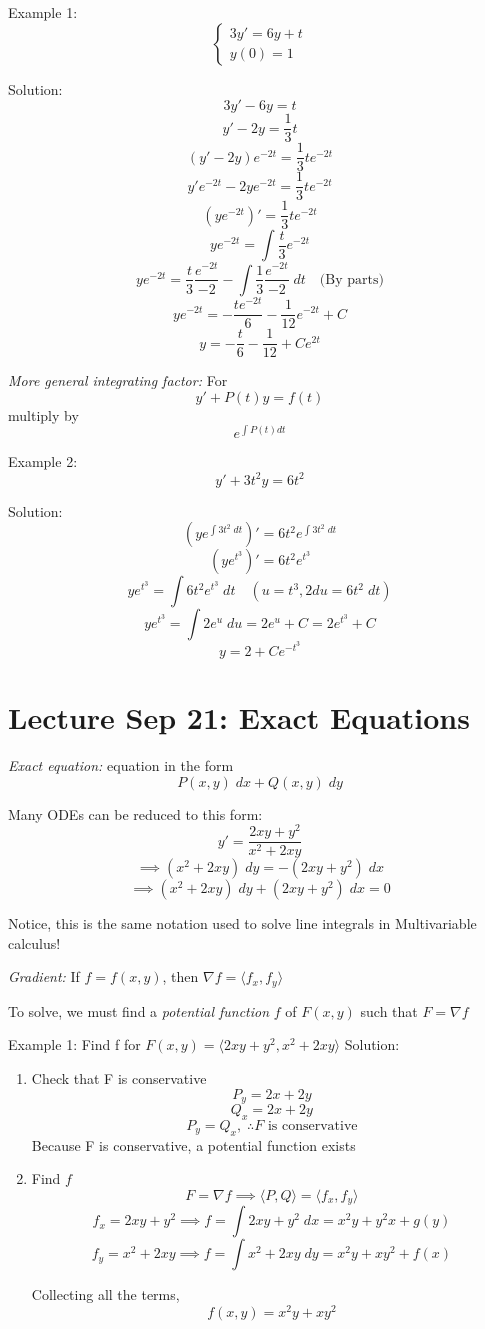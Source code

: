 \documentclass[12pt]{article}
\begin{document}
Example 1: 
\[\begin{cases}
    3y' = 6y + t\\
    y(0) = 1
\end{cases}\]

Solution:
\[3y' - 6y = t\]
\[y' - 2y = \frac{1}{3}t\]
\[(y' - 2y)e^{-2t} = \frac{1}{3}te^{-2t}\]
\[y'e^{-2t} - 2y e^{-2t} = \frac{1}{3}te^{-2t} \]
\[(y e^{-2t})' = \frac{1}{3}te^{-2t}\]
\[y e^{-2t} = \int \frac{t}{3}e^{-2t}\]
\[y e^{-2t} = \frac{t}{3} \frac{e^{-2t}}{-2} - \int \frac{1}{3} \frac{e^{-2t}}{-2}\; dt \quad \text{(By parts)}\]
\[y e^{-2t} = -\frac{te^{-2t}}{6} - \frac{1}{12}e^{-2t}+C\]
\[\boxed{y = -\frac{t}{6} - \frac{1}{12} + Ce^{2t}}\]

\emph{More general integrating factor:}
For \[y' + P(t) y = f(t)\]
multiply by 
\[e^{\int P(t) dt}\]

Example 2: 
\[y' + 3t^2 y = 6t^2\]

Solution:
\[(y e^{\int 3t^2\; dt})'= 6t^2 e^{\int 3t^2\; dt}\]
\[(y e^{t^3})' = 6t^2 e^{t^3}\]
\[ye^{t^3} = \int 6t^2 e^{t^3} \; dt \quad (u = t^3, 2du = 6t^2\; dt)\]
\[ye^{t^3} = \int 2e^u \; du = 2e^u + C = 2e^{t^3} + C\]
\[y = 2 + Ce^{-t^3}\]

\section{Lecture Sep 21: Exact Equations}
\emph{Exact equation:} equation in the form 
\[P(x, y) \; dx + Q(x, y) \; dy\]

Many ODEs can be reduced to this form:
\[y' = \frac{2xy + y^2}{x^2 + 2xy}\]
\[\implies (x^2 + 2xy) \; dy = -(2xy + y^2) \; dx\]
\[\implies (x^2 + 2xy) \; dy + (2xy + y^2) \; dx = 0\]

Notice, this is the same notation used to solve line integrals in Multivariable calculus!

\emph{Gradient:} If $f = f(x,y)$, then $\nabla f = \langle f_x, f_y \rangle$

To solve, we must find a \emph{potential function} $f$ of $F(x, y)$ such that $F = \nabla f$

Example 1: Find f for $F(x,y) = \langle2xy + y^2, x^2 + 2xy\rangle$
Solution:
\begin{enumerate}
    \item Check that F is conservative
    \[P_y = 2x + 2y\]
    \[Q_x = 2x + 2y\]
    \[P_y = Q_x, \; \therefore F \text{ is conservative}\]
    Because F is conservative, a potential function exists 

    \item Find $f$
    \[F = \nabla f \implies \langle P, Q\rangle = \langle f_x, f_y \rangle\]
    \[f_x = 2xy + y^2 \implies f = \int 2xy + y^2\; dx = x^2y + y^2x + g(y)\]
    \[f_y = x^2 + 2xy \implies f = \int x^2 + 2xy\; dy = x^2 y + xy^2 + f(x)\]

    Collecting all the terms,
    \[f(x, y) = x^2 y + xy^2\]
\end{enumerate}
\end{document}
